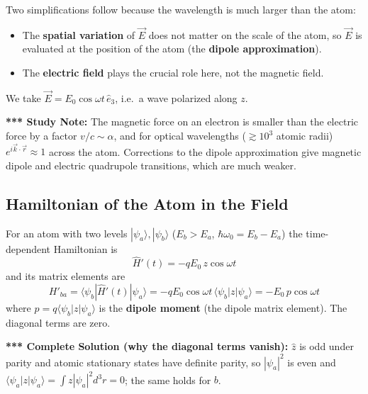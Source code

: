 \documentclass[11pt,a4paper]{article}
\begin{document}
\begin{center}
\end{center}

Two simplifications follow because the wavelength is much larger than the atom:
\begin{itemize}
    \item The \textbf{spatial variation} of $\vec E$ does not matter on the scale of the atom, so $\vec E$ is evaluated at the position of the atom (the \textbf{dipole approximation}).
    \item The \textbf{electric field} plays the crucial role here, not the magnetic field.
\end{itemize}
We take $\vec E=E_0\cos\omega t\,\hat e_3$, i.e.\ a wave polarized along $z$.

\textbf{*** Study Note:} The magnetic force on an electron is smaller than the electric force by a factor $v/c\sim\alpha$, and for optical wavelengths ($\gtrsim10^3$ atomic radii) $e^{i\vec k\cdot\vec r}\approx1$ across the atom. Corrections to the dipole approximation give magnetic dipole and electric quadrupole transitions, which are much weaker.

\subsection{Hamiltonian of the Atom in the Field}
For an atom with two levels $|\psi_a\rangle,|\psi_b\rangle$ ($E_b>E_a$, $\hbar\omega_0=E_b-E_a$) the time-dependent Hamiltonian is
\[
\hat H'(t)=-qE_0\,z\cos\omega t
\]
and its matrix elements are
\[
H'_{ba}=\langle\psi_b|\hat H'(t)|\psi_a\rangle=-qE_0\cos\omega t\,\langle\psi_b|z|\psi_a\rangle=-E_0\,p\cos\omega t
\]
where $p=q\langle\psi_b|z|\psi_a\rangle$ is the \textbf{dipole moment} (the dipole matrix element). The diagonal terms are zero.

\textbf{*** Complete Solution (why the diagonal terms vanish):} $\hat z$ is odd under parity and atomic stationary states have definite parity, so $|\psi_a|^2$ is even and $\langle\psi_a|z|\psi_a\rangle=\int z|\psi_a|^2d^3r=0$; the same holds for $b$.
\end{document}
